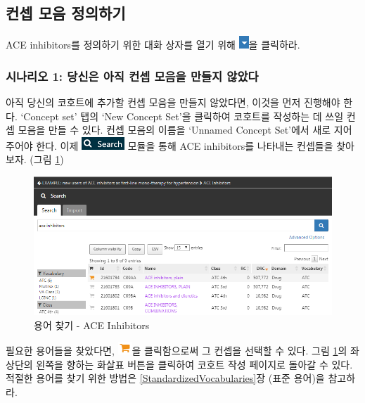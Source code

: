 \documentclass[11pt]{book}
\theoremstyle{definition}
\theoremstyle{definition}
\theoremstyle{definition}
\theoremstyle{remark}
\begin{document}
\subsection{컨셉 모음 정의하기}\label{--}

ACE inhibitors를 정의하기 위한 대화 상자를 열기 위해
\includegraphics{images/Cohorts/downarrow.png}을 클릭하라.

\subsubsection*{시나리오 1: 당신은 아직 컨셉 모음을 만들지
않았다}\label{-1------}

아직 당신의 코호트에 추가할 컨셉 모음을 만들지 않았다면, 이것을 먼저
진행해야 한다. `Concept set' 탭의 `New Concept Set'을 클릭하여 코호트를
작성하는 데 쓰일 컨셉 모음을 만들 수 있다. 컨셉 모음의 이름을 `Unnamed
Concept Set'에서 새로 지어 주어야 한다. 이제
\includegraphics{images/Cohorts/search-2.png} 모듈을 통해 ACE
inhibitors를 나타내는 컨셉들을 찾아보자. (그림 \ref{fig:aceinhibitors})

\begin{figure}

{\centering \includegraphics[width=1\linewidth]{images/Cohorts/aceinhibitors} 

}

\caption{용어 찾기 - ACE Inhibitors}\label{fig:aceinhibitors}
\end{figure}

필요한 용어들을 찾았다면,
\includegraphics{images/Cohorts/shoppingcart.png}을 클릭함으로써 그
컨셉을 선택할 수 있다. 그림 \ref{fig:aceinhibitors}의 좌상단의 왼쪽을
향하는 화살표 버튼을 클릭하여 코호트 작성 페이지로 돌아갈 수 있다.
적절한 용어를 찾기 위한 방법은 \ref{StandardizedVocabularies}장 (표준
용어)을 참고하라.
\end{document}
